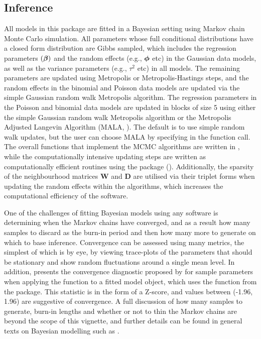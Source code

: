 \documentclass[article, nojss]{jss}
\newcommand{\bd}[1]{\ensuremath{\mbox{\boldmath $#1$}}}
\begin{document}
\subsection{Inference}
All models in this package are fitted in a Bayesian setting using Markov chain Monte Carlo simulation. All parameters whose full conditional distributions have a closed form distribution are Gibbs sampled, which includes the regression parameters $(\bd{\beta})$ and the random effects (e.g., $\bd{\phi}$ etc) in the Gaussian data models, as well as the variance parameters (e.g., $\tau^2$ etc) in all models. The remaining parameters are updated using Metropolis or Metropolis-Hastings steps, and the random effects in the binomial and Poisson data models are updated via the simple Gaussian random walk Metropolis algorithm. The regression parameters in the Poisson and binomial data models are updated in blocks of size 5 using either the simple Gaussian random walk Metropolis algorithm or the Metropolis Adjusted Langevin Algorithm (MALA, \citealp{roberts1998}). The default is to use simple random walk updates, but the user can choose MALA by specifying  in the function call. The overall functions that implement the MCMC algorithms are written in , while the computationally intensive updating steps are written as computationally efficient   routines using the  package  (\citealp{eddelbuettel2011}). Additionally, the sparsity of the neighbourhood matrices $\mathbf{W}$ and $\mathbf{D}$ are utilised via their triplet forms when updating the random effects  within the algorithms, which increases the computational efficiency of the software.

\hspace{1cm} One of the challenges of fitting Bayesian models using any software is determining when the Markov chains have converged, and as a result how many samples to discard as the burn-in period and then how many more to generate on which to base inference. Convergence can be assessed using many metrics, the simplest of which is by eye, by viewing trace-plots of the parameters that should be stationary and show random fluctuations around a single mean level. In addition,  presents the convergence  diagnostic proposed by \cite{geweke1992} for sample parameters when applying the  function to a fitted model object, which uses the  function from the  package. This statistic is in the form of a Z-score, and values between (-1.96, 1.96) are suggestive of convergence. A full discussion of how many samples to generate, burn-in lengths and whether or not to thin the Markov chains are beyond the scope of this vignette, and further details can be found in general texts on Bayesian modelling such as \cite{gelman2013}.
\end{document}
